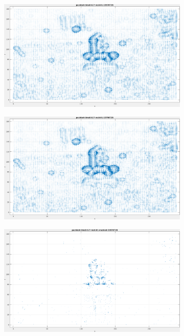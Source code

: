 \begin{figure}[tb]
\centering
\begin{subfigure}{.45\textwidth}
  \centering
  \includegraphics[height=.6\linewidth]{figs/pushbot/pushbot-1.png}
  \caption{}
\end{subfigure}
\begin{subfigure}{.45\textwidth}
  \centering
  \includegraphics[height=.6\linewidth]{figs/pushbot/pushbot-2.png}
  \caption{}
\end{subfigure}
\begin{subfigure}{.45\textwidth}
  \includegraphics[height=.6\linewidth]{figs/pushbot/pushbot-masked-1.png}

\end{subfigure}
\end{figure}
